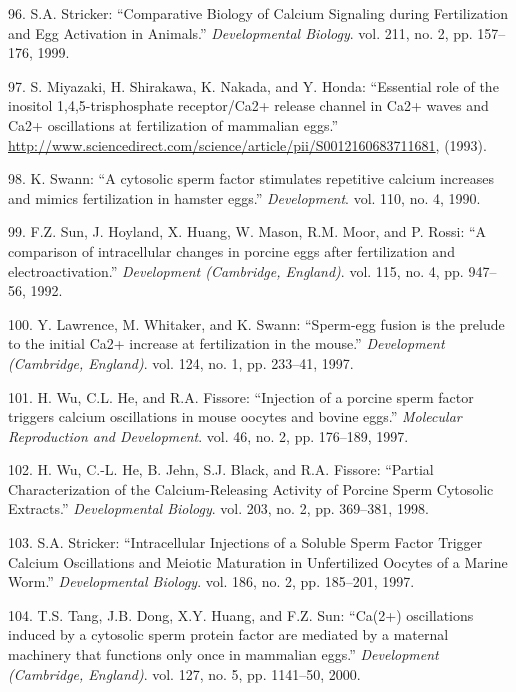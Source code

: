 \documentclass[12pt,a4paper,twoside]{ugathesis}
\theoremstyle{definition}
\theoremstyle{definition}
\theoremstyle{definition}
\theoremstyle{remark}
\begin{document}
\hypertarget{ref-Stricker}{}
96. S.A. Stricker: ``Comparative Biology of Calcium Signaling during
Fertilization and Egg Activation in Animals.'' \emph{Developmental
Biology}. vol. 211, no. 2, pp. 157--176, 1999.

\hypertarget{ref-Miyazaki1993}{}
97. S. Miyazaki, H. Shirakawa, K. Nakada, and Y. Honda: ``Essential role
of the inositol 1,4,5-trisphosphate receptor/Ca2+ release channel in
Ca2+ waves and Ca2+ oscillations at fertilization of mammalian eggs.''
\url{http://www.sciencedirect.com/science/article/pii/S0012160683711681},
(1993).

\hypertarget{ref-Swann1990}{}
98. K. Swann: ``A cytosolic sperm factor stimulates repetitive calcium
increases and mimics fertilization in hamster eggs.''
\emph{Development}. vol. 110, no. 4, 1990.

\hypertarget{ref-Sun1992}{}
99. F.Z. Sun, J. Hoyland, X. Huang, W. Mason, R.M. Moor, and P. Rossi:
``A comparison of intracellular changes in porcine eggs after
fertilization and electroactivation.'' \emph{Development (Cambridge,
England)}. vol. 115, no. 4, pp. 947--56, 1992.

\hypertarget{ref-Lawrence1997}{}
100. Y. Lawrence, M. Whitaker, and K. Swann: ``Sperm-egg fusion is the
prelude to the initial Ca2+ increase at fertilization in the mouse.''
\emph{Development (Cambridge, England)}. vol. 124, no. 1, pp. 233--41,
1997.

\hypertarget{ref-Wu1997}{}
101. H. Wu, C.L. He, and R.A. Fissore: ``Injection of a porcine sperm
factor triggers calcium oscillations in mouse oocytes and bovine eggs.''
\emph{Molecular Reproduction and Development}. vol. 46, no. 2, pp.
176--189, 1997.

\hypertarget{ref-Wu1998}{}
102. H. Wu, C.-L. He, B. Jehn, S.J. Black, and R.A. Fissore: ``Partial
Characterization of the Calcium-Releasing Activity of Porcine Sperm
Cytosolic Extracts.'' \emph{Developmental Biology}. vol. 203, no. 2, pp.
369--381, 1998.

\hypertarget{ref-Stricker1997}{}
103. S.A. Stricker: ``Intracellular Injections of a Soluble Sperm Factor
Trigger Calcium Oscillations and Meiotic Maturation in Unfertilized
Oocytes of a Marine Worm.'' \emph{Developmental Biology}. vol. 186, no.
2, pp. 185--201, 1997.

\hypertarget{ref-Tang2000}{}
104. T.S. Tang, J.B. Dong, X.Y. Huang, and F.Z. Sun: ``Ca(2+)
oscillations induced by a cytosolic sperm protein factor are mediated by
a maternal machinery that functions only once in mammalian eggs.''
\emph{Development (Cambridge, England)}. vol. 127, no. 5, pp. 1141--50,
2000.
\end{document}
